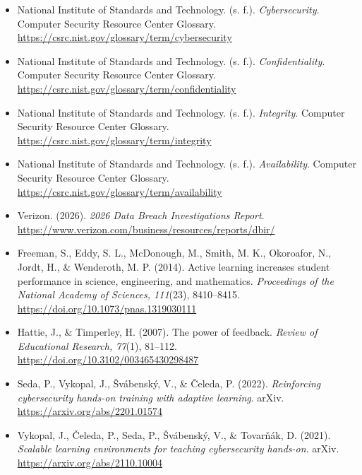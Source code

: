 \documentclass[12pt]{article}
\begin{document}
\begin{itemize}
    \item National Institute of Standards and Technology. (s. f.). \textit{Cybersecurity}. Computer Security Resource Center Glossary. \url{https://csrc.nist.gov/glossary/term/cybersecurity}

    \item National Institute of Standards and Technology. (s. f.). \textit{Confidentiality}. Computer Security Resource Center Glossary. \url{https://csrc.nist.gov/glossary/term/confidentiality}

    \item National Institute of Standards and Technology. (s. f.). \textit{Integrity}. Computer Security Resource Center Glossary. \url{https://csrc.nist.gov/glossary/term/integrity}

    \item National Institute of Standards and Technology. (s. f.). \textit{Availability}. Computer Security Resource Center Glossary. \url{https://csrc.nist.gov/glossary/term/availability}

    \item Verizon. (2026). \textit{2026 Data Breach Investigations Report}. \url{https://www.verizon.com/business/resources/reports/dbir/}

    \item Freeman, S., Eddy, S. L., McDonough, M., Smith, M. K., Okoroafor, N., Jordt, H., \& Wenderoth, M. P. (2014). Active learning increases student performance in science, engineering, and mathematics. \textit{Proceedings of the National Academy of Sciences, 111}(23), 8410--8415. \url{https://doi.org/10.1073/pnas.1319030111}

    \item Hattie, J., \& Timperley, H. (2007). The power of feedback. \textit{Review of Educational Research, 77}(1), 81--112. \url{https://doi.org/10.3102/003465430298487}

    \item Seda, P., Vykopal, J., Švábenský, V., \& Čeleda, P. (2022). \textit{Reinforcing cybersecurity hands-on training with adaptive learning}. arXiv. \url{https://arxiv.org/abs/2201.01574}

    \item Vykopal, J., Čeleda, P., Seda, P., Švábenský, V., \& Tovarňák, D. (2021). \textit{Scalable learning environments for teaching cybersecurity hands-on}. arXiv. \url{https://arxiv.org/abs/2110.10004}
\end{itemize}
\end{document}
